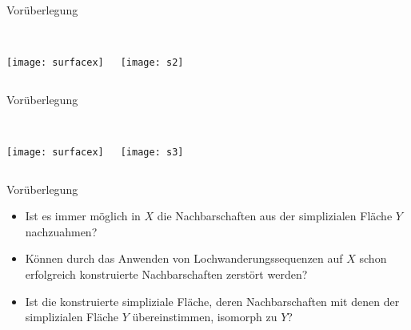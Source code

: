 \documentclass{beamer}
\begin{document}
\begin{frame}{{Vorüberlegung}}
\begin{columns}
   \\
    \texttt{[image: surfacex]}
 
    \\
    \texttt{[image: s2]}
\end{columns}
\end{frame}
\begin{frame}{{Vorüberlegung}}
\begin{columns}
   \\
    \texttt{[image: surfacex]}
 
    \\
    \texttt{[image: s3]}
\end{columns}
\end{frame}

\begin{frame}{Vorüberlegung}
\begin{itemize}
\item Ist es immer möglich in $X$ die Nachbarschaften aus der simplizialen Fläche $Y$ nachzuahmen?\pause
\item Können durch das Anwenden von Lochwanderungssequenzen auf $X$ schon erfolgreich konstruierte Nachbarschaften zerstört werden?\pause
\item Ist die konstruierte simpliziale Fläche, deren Nachbarschaften mit denen der simplizialen Fläche $Y$ übereinstimmen, isomorph zu $Y$? 
\end{itemize}
\end{frame}
\end{document}
